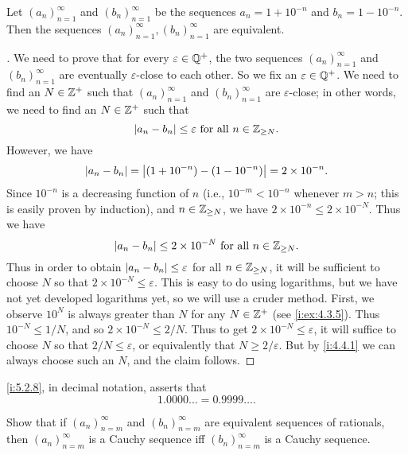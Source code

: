 \begin{prop}\label{i:5.2.8}
  Let \((a_n)_{n = 1}^{\infty}\) and \((b_n)_{n = 1}^{\infty}\) be the sequences \(a_n = 1 + 10^{-n}\) and \(b_n = 1 - 10^{-n}\).
  Then the sequences \((a_n)_{n = 1}^{\infty}, (b_n)_{n = 1}^{\infty}\) are equivalent.
\end{prop}

\begin{proof}[]
  We need to prove that for every \(\varepsilon \in \mathbb{Q}^+\), the two sequences \((a_n)_{n = 1}^{\infty}\) and \((b_n)_{n = 1}^{\infty}\) are eventually \(\varepsilon\)-close to each other.
  So we fix an \(\varepsilon \in \mathbb{Q}^+\).
  We need to find an \(N \in \mathbb{Z}^+\) such that \((a_n)_{n = 1}^{\infty}\) and \((b_n)_{n = 1}^{\infty}\) are \(\varepsilon\)-close;
  in other words, we need to find an \(N \in \mathbb{Z}^+\) such that
  \[
    \left\lvert a_n - b_n\right\rvert \leq \varepsilon \text{ for all } n \in \mathbb{Z}_{\geq N}.
  \]
  However, we have
  \[
    \left\lvert a_n - b_n\right\rvert = \left\lvert(1 + 10^{-n}) - (1 - 10^{-n})\right\rvert = 2 \times 10^{-n}.
  \]
  Since \(10^{-n}\) is a decreasing function of \(n\) (i.e., \(10^{-m} < 10^{-n}\) whenever \(m > n\);
  this is easily proven by induction), and \(n \in \mathbb{Z}_{\geq N}\), we have \(2 \times 10^{-n} \leq 2 \times 10^{-N}\).
  Thus we have
  \[
    \left\lvert a_n - b_n\right\rvert \leq 2 \times 10^{-N} \text{ for all } n \in \mathbb{Z}_{\geq N}.
  \]
  Thus in order to obtain \(\left\lvert a_n - b_n\right\rvert \leq \varepsilon\) for all \(n \in \mathbb{Z}_{\geq N}\), it will be sufficient to choose \(N\) so that \(2 \times 10^{-N} \leq \varepsilon\).
  This is easy to do using logarithms, but we have not yet developed logarithms yet, so we will use a cruder method.
  First, we observe \(10^N\) is always greater than \(N\) for any \(N \in \mathbb{Z}^+\) (see \cref{i:ex:4.3.5}).
  Thus \(10^{-N} \leq 1 / N\), and so \(2 \times 10^{-N} \leq 2 / N\).
  Thus to get \(2 \times 10^{-N} \leq \varepsilon\), it will suffice to choose \(N\) so that \(2 / N \leq \varepsilon\), or equivalently that \(N \geq 2 / \varepsilon\).
  But by \cref{i:4.4.1} we can always choose such an \(N\), and the claim follows.
\end{proof}

\begin{rmk}\label{i:5.2.9}
  \cref{i:5.2.8}, in decimal notation, asserts that
  \[
    1.0000 \dots = 0.9999 \dots.
  \]
\end{rmk}

\exercisesection

\begin{ex}\label{i:ex:5.2.1}
  Show that if \((a_n)_{n = m}^{\infty}\) and \((b_n)_{n = m}^{\infty}\) are equivalent sequences of rationals, then \((a_n)_{n = m}^{\infty}\) is a Cauchy sequence iff \((b_n)_{n = m}^{\infty}\) is a Cauchy sequence.
\end{ex}

